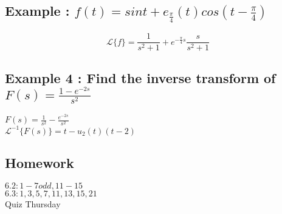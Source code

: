 \documentclass[12pt, letterpaper, twoside]{article}
\newcommand{\laplace}{\mathcal{L}}
\begin{document}
\subsection*{Example : $f(t)=sint+e_{\frac{\pi}{4}}(t)cos(t-\frac{\pi}{4})$}
$$\laplace\{f\}=\frac{1}{s^2+1}+e^{-\frac{\pi}{4}s}\frac{s}{s^2+1}$$

\subsection*{Example 4 : Find the inverse transform of $F(s) = \frac{1-e^{-2s}}{s^2}$}
$F(s) = \frac{1}{s^2} - \frac{e^{-2s}}{s^2}$\\
$\laplace^{-1}\{F(s)\} = t - u_2(t)(t-2)$\\

\subsection*{Homework}
$6.2 : 1-7odd, 11-15$\\
$6.3 : 1,3,5,7,11,13,15,21$\\
Quiz Thursday
\end{document}
